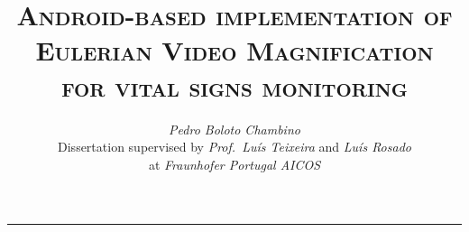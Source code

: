 \documentclass[9pt,a4paper]{extarticle}
\begin{document}
\title{\vspace*{-8mm}\textbf{\textsc{Android-based implementation of Eulerian Video Magnification\\for vital signs monitoring}}}
\author{\emph{Pedro Boloto Chambino}\\[2mm]
\small{Dissertation supervised by \emph{Prof.\ Luís Teixeira} and \emph{Luís Rosado}}\\
\small{at \emph{Fraunhofer Portugal AICOS}}}
\date{}
\maketitle
\thispagestyle{empty}

\vspace*{-4mm}\noindent\rule{\textwidth}{0.4pt}\vspace*{4mm}
\end{document}
